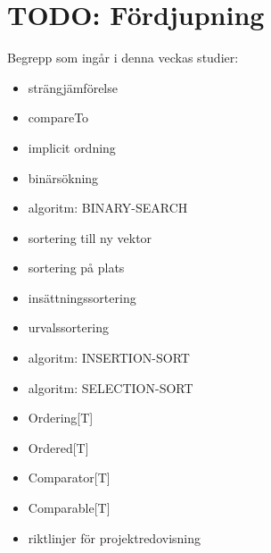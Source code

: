 \chapter{TODO: Fördjupning}\label{chapter:W12}
Begrepp som ingår i denna veckas studier:
\begin{itemize}[noitemsep,label={$\square$},leftmargin=*]
\item strängjämförelse
\item compareTo
\item implicit ordning
\item binärsökning
\item algoritm: BINARY-SEARCH
\item sortering till ny vektor
\item sortering på plats
\item insättningssortering
\item urvalssortering
\item algoritm: INSERTION-SORT
\item algoritm: SELECTION-SORT
\item Ordering[T]
\item Ordered[T]
\item Comparator[T]
\item Comparable[T]
\item riktlinjer för projektredovisning\end{itemize}
